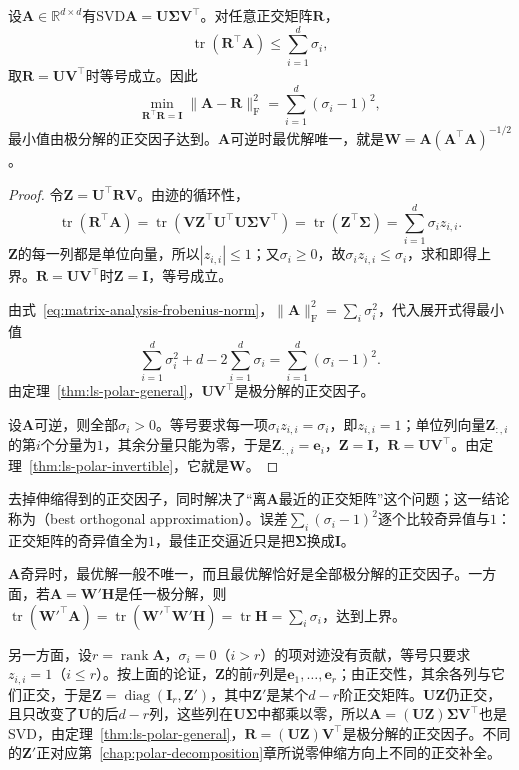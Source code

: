 \begin{theorem}[最佳正交逼近]
\label{thm:ls-best-orthogonal-approximation}
设$\bm A\in\mathbb R^{d\times d}$有SVD$\bm A=\bm U\bm\Sigma\bm V^\top$。对任意正交矩阵$\bm R$，
\[
 \operatorname{tr}(\bm R^\top\bm A)\leq\sum_{i=1}^d\sigma_i ,
\]
取$\bm R=\bm U\bm V^\top$时等号成立。因此
\[
 \min_{\bm R^\top\bm R=\bm I}\lVert\bm A-\bm R\rVert_{\mathrm F}^2
 =\sum_{i=1}^d(\sigma_i-1)^2 ,
\]
最小值由极分解的正交因子达到。$\bm A$可逆时最优解唯一，就是$\bm W=\bm A(\bm A^\top\bm A)^{-1/2}$。
\end{theorem}
\begin{proof}
令$\bm Z=\bm U^\top\bm R\bm V$。由迹的循环性，
\[
 \operatorname{tr}(\bm R^\top\bm A)
 =\operatorname{tr}(\bm V\bm Z^\top\bm U^\top\bm U\bm\Sigma\bm V^\top)
 =\operatorname{tr}(\bm Z^\top\bm\Sigma)
 =\sum_{i=1}^d\sigma_iz_{i,i}.
\]
$\bm Z$的每一列都是单位向量，所以$|z_{i,i}|\leq1$；又$\sigma_i\geq0$，故$\sigma_iz_{i,i}\leq\sigma_i$，求和即得上界。$\bm R=\bm U\bm V^\top$时$\bm Z=\bm I$，等号成立。

由式~\eqref{eq:matrix-analysis-frobenius-norm}，$\lVert\bm A\rVert_{\mathrm F}^2=\sum_i\sigma_i^2$，代入展开式得最小值
\[
 \sum_{i=1}^d\sigma_i^2+d-2\sum_{i=1}^d\sigma_i
 =\sum_{i=1}^d(\sigma_i-1)^2 .
\]
由定理~\ref{thm:ls-polar-general}，$\bm U\bm V^\top$是极分解的正交因子。

设$\bm A$可逆，则全部$\sigma_i>0$。等号要求每一项$\sigma_iz_{i,i}=\sigma_i$，即$z_{i,i}=1$；单位列向量$\bm Z_{:,i}$的第$i$个分量为$1$，其余分量只能为零，于是$\bm Z_{:,i}=\bm e_i$，$\bm Z=\bm I$，$\bm R=\bm U\bm V^\top$。由定理~\ref{thm:ls-polar-invertible}，它就是$\bm W$。
\end{proof}

去掉伸缩得到的正交因子，同时解决了“离$\bm A$最近的正交矩阵”这个问题；这一结论称为（best orthogonal approximation）。误差$\sum_i(\sigma_i-1)^2$逐个比较奇异值与$1$：正交矩阵的奇异值全为$1$，最佳正交逼近只是把$\bm\Sigma$换成$\bm I$。

$\bm A$奇异时，最优解一般不唯一，而且最优解恰好是全部极分解的正交因子。一方面，若$\bm A=\bm W'\bm H$是任一极分解，则$\operatorname{tr}(\bm W'^\top\bm A)=\operatorname{tr}(\bm W'^\top\bm W'\bm H)=\operatorname{tr}\bm H=\sum_i\sigma_i$，达到上界。

另一方面，设$r=\operatorname{rank}\bm A$，$\sigma_i=0$（$i>r$）的项对迹没有贡献，等号只要求$z_{i,i}=1$（$i\leq r$）。按上面的论证，$\bm Z$的前$r$列是$\bm e_1,\ldots,\bm e_r$；由正交性，其余各列与它们正交，于是$\bm Z=\operatorname{diag}(\bm I_r,\bm Z')$，其中$\bm Z'$是某个$d-r$阶正交矩阵。$\bm U\bm Z$仍正交，且只改变了$\bm U$的后$d-r$列，这些列在$\bm U\bm\Sigma$中都乘以零，所以$\bm A=(\bm U\bm Z)\bm\Sigma\bm V^\top$也是SVD，由定理~\ref{thm:ls-polar-general}，$\bm R=(\bm U\bm Z)\bm V^\top$是极分解的正交因子。不同的$\bm Z'$正对应第~\ref{chap:polar-decomposition}章所说零伸缩方向上不同的正交补全。

